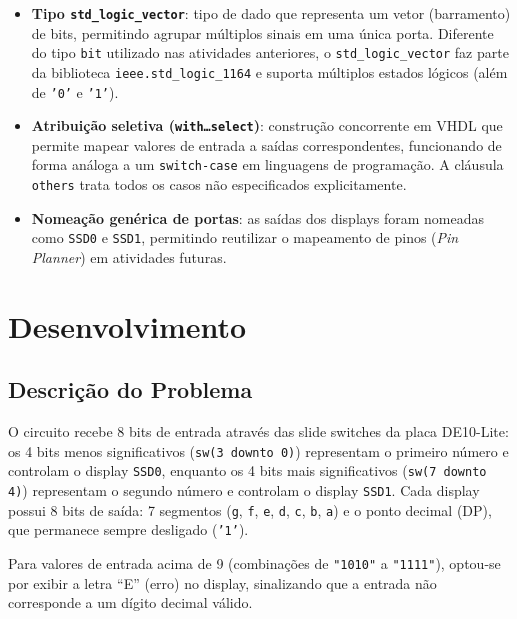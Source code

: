 \documentclass[12pt,a4paper, brazil]{article}
\begin{document}
\begin{itemize}
    \item \textbf{Tipo \texttt{std\_logic\_vector}}: tipo de dado que representa um vetor (barramento) de bits, permitindo agrupar múltiplos sinais em uma única porta. Diferente do tipo \texttt{bit} utilizado nas atividades anteriores, o \texttt{std\_logic\_vector} faz parte da biblioteca \texttt{ieee.std\_logic\_1164} e suporta múltiplos estados lógicos (além de \texttt{'0'} e \texttt{'1'}).
    \item \textbf{Atribuição seletiva (\texttt{with\ldots select})}: construção concorrente em VHDL que permite mapear valores de entrada a saídas correspondentes, funcionando de forma análoga a um \texttt{switch-case} em linguagens de programação. A cláusula \texttt{others} trata todos os casos não especificados explicitamente.
    \item \textbf{Nomeação genérica de portas}: as saídas dos displays foram nomeadas como \texttt{SSD0} e \texttt{SSD1}, permitindo reutilizar o mapeamento de pinos (\textit{Pin Planner}) em atividades futuras.
\end{itemize}

\section{Desenvolvimento}

\subsection{Descrição do Problema}

O circuito recebe 8 bits de entrada através das slide switches da placa DE10-Lite: os 4 bits menos significativos (\texttt{sw(3 downto 0)}) representam o primeiro número e controlam o display \texttt{SSD0}, enquanto os 4 bits mais significativos (\texttt{sw(7 downto 4)}) representam o segundo número e controlam o display \texttt{SSD1}. Cada display possui 8 bits de saída: 7 segmentos (\texttt{g}, \texttt{f}, \texttt{e}, \texttt{d}, \texttt{c}, \texttt{b}, \texttt{a}) e o ponto decimal (DP), que permanece sempre desligado (\texttt{'1'}).

Para valores de entrada acima de 9 (combinações de \texttt{"1010"} a \texttt{"1111"}), optou-se por exibir a letra ``E'' (erro) no display, sinalizando que a entrada não corresponde a um dígito decimal válido.
\end{document}
